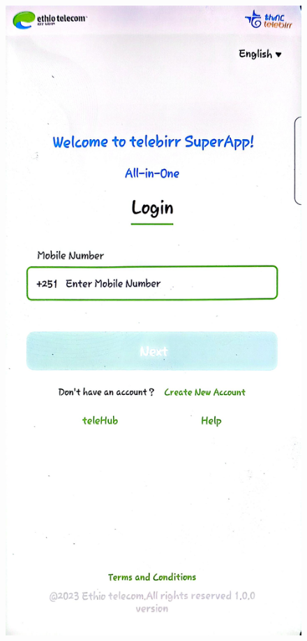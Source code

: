 \documentclass[a4paper,12pt]{report}
\begin{document}
\begin{figure}[h]
  \centering
  \begin{minipage}[b]{0.3\textwidth}
    \includegraphics[width=\linewidth]{../images/screenshots/telebirr/telebirr_login.jpg}

\end{minipage}
\end{figure}
\end{document}
